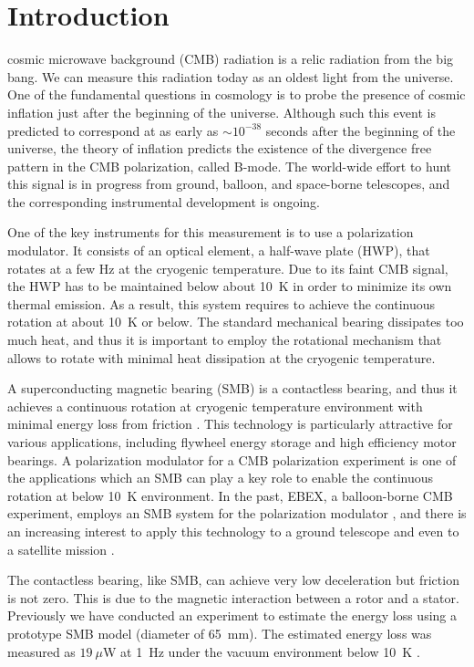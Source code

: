 \documentclass[journal]{IEEEtran}
\begin{document}
\section{Introduction}
 cosmic microwave background (CMB) radiation is a relic radiation from the big bang.
We can measure this radiation today as an oldest light from the universe.
One of the fundamental questions in cosmology is to probe the presence of cosmic inflation just after the beginning of the universe.
Although such this event is predicted to correspond at as early as $\sim10^{-38}$ seconds after the beginning of the universe, the theory of inflation predicts the existence of the divergence free pattern in the CMB polarization, called B-mode.
The world-wide effort to hunt this signal is in progress from ground, balloon, and space-borne telescopes, and the corresponding instrumental development is ongoing.

One of the key instruments for this measurement is to use a polarization modulator.
It consists of an optical element, a half-wave plate (HWP), that rotates at a few Hz at the cryogenic temperature.
Due to its faint CMB signal, the HWP has to be maintained below about 10~K in order to minimize its own thermal emission.
As a result, this system requires to achieve the continuous rotation at about 10~K or below.
The standard mechanical bearing dissipates too much heat, and thus it is important to employ the rotational mechanism that allows to rotate with minimal heat dissipation at the cryogenic temperature.

A superconducting magnetic bearing (SMB) is a contactless bearing, and thus it achieves a continuous rotation at cryogenic temperature environment with minimal energy loss from friction \cite{hull_review}.
This technology is particularly attractive for various applications, including flywheel energy storage and high efficiency motor bearings.
A polarization modulator for a CMB polarization experiment is one of the applications which an SMB can play a key role to enable the continuous rotation at below 10~K environment.
In the past, EBEX, a balloon-borne CMB experiment, employs an SMB system for the polarization modulator \cite{jklein}, and there is an increasing interest to apply this technology to a ground telescope and even to a satellite mission \cite{litebird}.

The contactless bearing, like SMB, can achieve very low deceleration but friction is not zero.
This is due to the magnetic interaction between a rotor and a stator.
Previously we have conducted an experiment to estimate the energy loss using a prototype SMB model (diameter of 65~mm).
The estimated energy loss was measured as $19~\mu$W at 1~Hz under the vacuum environment below 10~K \cite{matsumura_eucas2015}.
\end{document}
